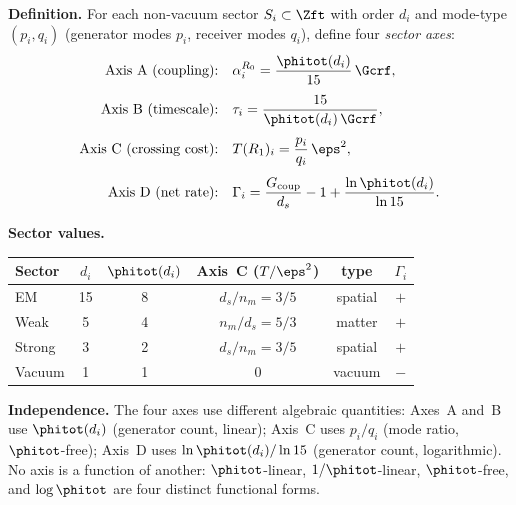 \documentclass[12pt, a4paper]{article}
\begin{document}
\begin{formalbox}[title={LEM-ZC49-01: Four Axes of the
  $\mathbb{Z}_{15}$ Sector Description}]
\textbf{Definition.}
For each non-vacuum sector $S_i \subset \Zft$ with order
$d_i$ and mode-type $(p_i, q_i)$ (generator modes $p_i$,
receiver modes $q_i$), define four \emph{sector axes}:
\begin{align}
  \text{Axis A (coupling):}\quad
  &\alpha_i^{R_0} = \frac{\phitot(d_i)}{15}\,\Gcrf,
  \label{eq:axisA}\\[4pt]
  \text{Axis B (timescale):}\quad
  &\tau_i = \frac{15}{\phitot(d_i)\,\Gcrf},
  \label{eq:axisB}\\[4pt]
  \text{Axis C (crossing cost):}\quad
  &T(R_1)_i = \frac{p_i}{q_i}\,\eps^2,
  \label{eq:axisC}\\[4pt]
  \text{Axis D (net rate):}\quad
  &\Gamma_i = \frac{G_{\rm coup}}{d_s} - 1
    + \frac{\ln\phitot(d_i)}{\ln 15}.
  \label{eq:axisD}
\end{align}

\textbf{Sector values.}
{\small
\renewcommand{\arraystretch}{1.35}
\begin{center}
\begin{tabular}{lccccc}
\toprule
\textbf{Sector} & $d_i$ & $\phitot(d_i)$ &
  Axis~C ($T/\eps^2$) & type & $\Gamma_i$ \\
\midrule
EM     & 15 & 8 & $d_s/n_m = 3/5$ & spatial & $+$ \\
Weak   &  5 & 4 & $n_m/d_s = 5/3$ & matter  & $+$ \\
Strong &  3 & 2 & $d_s/n_m = 3/5$ & spatial & $+$ \\
Vacuum &  1 & 1 & $0$              & vacuum  & $-$ \\
\bottomrule
\end{tabular}
\end{center}
}

\textbf{Independence.}
The four axes use different algebraic quantities:
Axes~A and~B use $\phitot(d_i)$ (generator count, linear);
Axis~C uses $p_i/q_i$ (mode ratio, $\phitot$-free);
Axis~D uses $\ln\phitot(d_i)/\ln 15$ (generator count,
logarithmic).
No axis is a function of another: $\phitot$-linear,
$1/\phitot$-linear, $\phitot$-free, and $\log\phitot$
are four distinct functional forms.
\end{formalbox}
\end{document}
